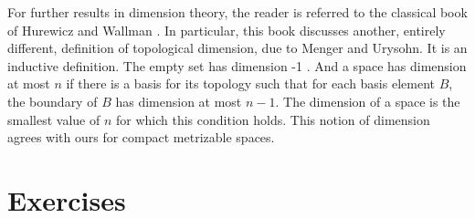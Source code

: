 For further results in dimension theory, the reader is referred to the classical book of Hurewicz and Wallman \cite{HurewiczWallman1974}. In particular, this book discusses another, entirely different, definition of topological dimension, due to Menger and Urysohn. It is an inductive definition. The empty set has dimension -1 . And a space has dimension at most \(n\) if there is a basis for its topology such that for each basis element \(B\), the boundary of \(B\) has dimension at most \(n - 1\). The dimension of a space is the smallest value of \(n\) for which this condition holds. This notion of dimension agrees with ours for compact metrizable spaces.

\section*{Exercises}
